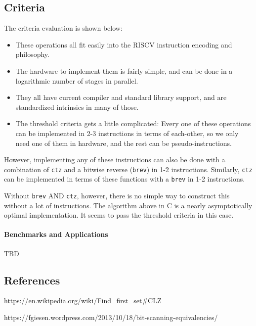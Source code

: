 \subsection{Criteria}

The criteria evaluation is shown below:

\begin{itemize}
\item
  These operations all fit easily into the RISCV instruction encoding
  and philosophy.
\item
  The hardware to implement them is fairly simple, and can be done in a
  logarithmic number of stages in parallel.
\item
  They all have current compiler and standard library support, and are
  standardized intrinsics in many of those.
\item
  The threshold criteria gets a little complicated: Every one of these
  operations can be implemented in 2-3 instructions in terms of
  each-other, so we only need one of them in hardware, and the rest can
  be pseudo-instructions.
\end{itemize}

However, implementing any of these instructions can also be done with a
combination of \texttt{ctz} and a bitwise reverse (\texttt{brev}) in 1-2
instructions. Similarly, \texttt{ctz} can be implemented in terms of
these functions with a \texttt{brev} in 1-2 instructions.

Without \texttt{brev} AND \texttt{ctz}, however, there is no simple way
to construct this without a lot of instructions. The algorithm above in
C is a nearly asymptotically optimal implementation. It seems to pass
the threshold criteria in this case.

\paragraph{Benchmarks and Applications}

TBD

\subsection{References}

https://en.wikipedia.org/wiki/Find\_first\_set\#CLZ

https://fgiesen.wordpress.com/2013/10/18/bit-scanning-equivalencies/


